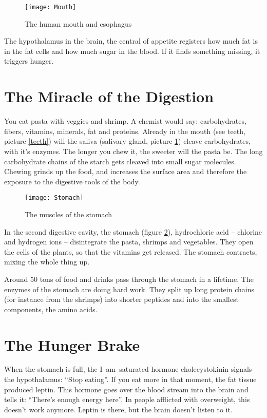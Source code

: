 \documentclass[../main.tex]{subfiles}
\begin{document}
\begin{figure}[htb!]
  \texttt{[image: Mouth]}
  \caption{The human mouth and esophagus~\cite{Mouth}}\label{mouth}
\end{figure}

  The hypothalamus in the brain, the central of appetite registers how much fat is in the fat cells and how much sugar in the blood.
If it finds something missing, it triggers hunger.

\section{The Miracle of the Digestion}

You eat pasta with veggies and shrimp.
A chemist would say: carbohydrates, fibers, vitamins, minerals, fat and proteins.
Already in the mouth (see teeth, picture \ref{teeth})
will the saliva (salivary gland, picture \ref{mouth}) cleave carbohydrates, with it's enzymes.
The longer you chew it, the sweeter will the pasta be.
The long carbohydrate chains of the starch gets cleaved into small sugar molecules.
Chewing grinds up the food, and increases the surface area and therefore the exposure to the digestive tools of the body. 


\begin{figure}[htb!]
  \texttt{[image: Stomach]}
  \caption{The muscles of the stomach~\cite{Stomach}}\label{stomach}
\end{figure}

In the second digestive cavity, the stomach (figure \ref{stomach}),
hydrochloric acid -- chlorine and hydrogen ions -- disintegrate the pasta, shrimps and vegetables.
They open the cells of the plants, so that the vitamins get released.
The stomach contracts, mixing the whole thing up.

Around 50 tons of food and drinks pass through the stomach in a lifetime.
The enzymes of the stomach are doing hard work.
They split up long protein chains (for instance from the shrimps) into shorter
peptides and into the smallest components, the amino acids.

\section{The Hunger Brake}

When the stomach is full, the I--am--saturated hormone cholecystokinin signals the hypothalamus: ``Stop eating''.
If you eat more in that moment, the fat tissue produced leptin.
This hormone goes over the blood stream into the brain and tells it: ``There's enough energy here''.
In people afflicted with overweight, this doesn't work anymore.
Leptin is there, but the brain doesn't listen to it.
\end{document}
